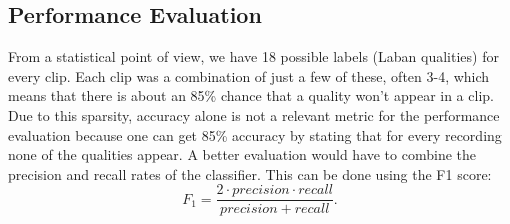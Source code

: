 \documentclass[11pt,twocolumn,varwidth=true,a4paper,fleqn]{article}
\begin{document}
\subsection{Performance Evaluation}
From a statistical point of view, we have 18 possible labels (Laban qualities) for every clip. 
Each clip was a combination of just a few of these, often 3-4, which means that there is about 
an 85\% chance that a quality won't appear in a clip. Due to this sparsity, accuracy alone is 
not a relevant metric for the performance evaluation because one can get 85\% accuracy by stating 
that for every recording none of the qualities appear. 
A better evaluation would have to combine the precision and recall rates of the classifier. 
This can be done using the F1 score:
\begin{equation*}
F_{1} = \frac{2\cdot precision\cdot recall}{precision+recall}.
\end{equation*} 
\end{document}
